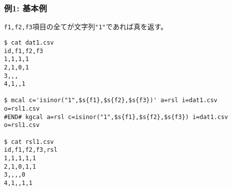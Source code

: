 
\subsubsection*{例1: 基本例}

\verb|f1,f2,f3|項目の全てが文字列\verb|"1"|であれば真を返す。

\begin{Verbatim}[baselinestretch=0.7,frame=single]
$ cat dat1.csv
id,f1,f2,f3
1,1,1,1
2,1,0,1
3,,,
4,1,,1

$ mcal c='isinor("1",$s{f1},$s{f2},$s{f3})' a=rsl i=dat1.csv o=rsl1.csv
#END# kgcal a=rsl c=isinor("1",$s{f1},$s{f2},$s{f3}) i=dat1.csv o=rsl1.csv

$ cat rsl1.csv
id,f1,f2,f3,rsl
1,1,1,1,1
2,1,0,1,1
3,,,,0
4,1,,1,1
\end{Verbatim}
